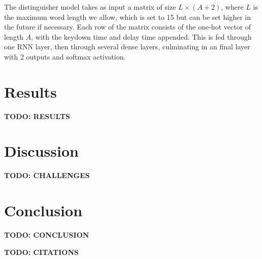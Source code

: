 \documentclass{amsart}
\begin{document}
\begin{multicols*}{2}
The distinguisher model takes as input a matrix of size $L \times (A + 2)$, where $L$ is the maximum word length we allow, which is set to 15 but can be set higher in the future if necessary. Each row of the matrix consists of the one-hot vector of length $A$, with the keydown time and delay time appended. This is fed through one RNN layer, then through several dense layers, culminating in an final layer with 2 outputs and softmax activation.

\section{Results}

\textbf{TODO: RESULTS}

\section{Discussion}

\textbf{TODO: CHALLENGES}

\section{Conclusion}

\textbf{TODO: CONCLUSION}

\textbf{TODO: CITATIONS}

\end{multicols*}
\end{document}
